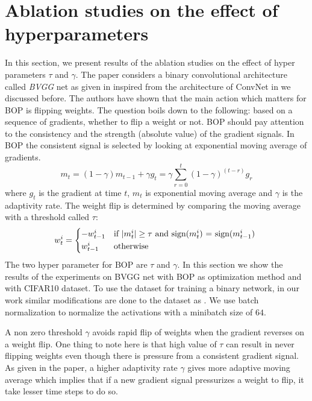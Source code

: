 \section{Ablation studies on the effect of hyperparameters}
In this section, we present results of the ablation studies on the effect of hyper parameters $\tau$ and $\gamma$. The paper \cite{helwegen2019latent} considers a binary convolutional architecture called \textit{BVGG} net as given in \cite{simonyan2014very} inspired from the architecture of ConvNet in \cite{courbariaux2016binarized} we discussed before. The authors have shown that the main action which matters for BOP is flipping weights. The question boils down to the following: based on a sequence of gradients, whether to flip a weight or not. BOP should pay attention to the consistency and the strength (absolute value) of the gradient signals. In BOP the consistent signal is selected by looking at exponential moving average of gradients.
\begin{equation}
    m_t=(1-\gamma)m_{t-1} + \gamma g_t=\gamma \sum_{r=0}^{t}(1-\gamma)^{(t-r)}g_r \label{eqn:gamma}
\end{equation}
where $g_t$ is the gradient at time $t$, $m_t$ is exponential moving average and $\gamma$ is the adaptivity rate. The weight flip is determined by comparing the moving average with a threshold called $\tau$:
\begin{equation}
    w_t^i =
    \begin{cases*}
      -w_{t-1}^i & if $|m_t^i|\geq\tau$ and sign$(m_t^i)$ = sign$(m_{t-1}^i)$ \\
      w_{t-1}^i        & otherwise \label{eqn:tau}
    \end{cases*}
\end{equation}
The two hyper parameter for BOP are $\tau$ and $\gamma$. In this section we show the results of the experiments on BVGG net with BOP as optimization method and with CIFAR10 dataset. To use the dataset for training a binary network, in our work similar modifications are done to the dataset as \cite{helwegen2019latent}. We use batch normalization to normalize the activations with a minibatch size of $64$. 

A non zero threshold $\gamma$ avoids rapid flip of weights when the gradient reverses on a weight flip. One thing to note here is that high value of $\tau$ can result in never flipping weights even though there is pressure from a consistent gradient signal. As given in the paper, a higher adaptivity rate $\gamma$ gives more adaptive moving average which implies that if a new gradient signal pressurizes a weight to flip, it take lesser time steps to do so.

